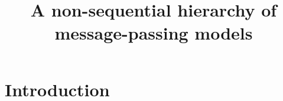 \documentclass[a4paper,12pt,titlepage,oneside,openany]{book}
\begin{document}
\title{A non-sequential hierarchy of message-passing models}


% 

\maketitle

\chapter{Introduction}
\end{document}
